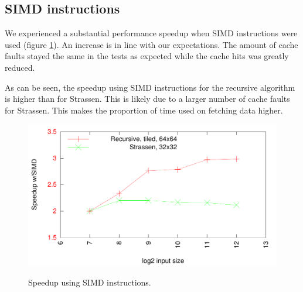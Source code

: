 



\subsection{SIMD instructions}

We experienced a substantial performance speedup when SIMD instructions were used (figure \ref{fig:simd}). An increase is in line with our expectations. The amount of cache faults stayed the same in the tests as expected while the cache hits was greatly reduced.

As can be seen, the speedup using SIMD instructions for the recursive algorithm is higher than for Strassen. This is likely due to a larger number of cache faults for Strassen. This makes the proportion of time used on fetching data higher.

\begin{figure}[h!]
  \centering
  \includegraphics[width=\textwidth]{"../project2/gnuplots/simd_performance"}
  \label{fig:simd}
  \caption{Speedup using SIMD instructions.}
\end{figure}

